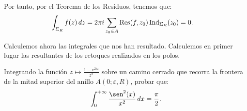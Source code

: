 \begin{ejercicio}
    Por tanto, por el Teorema de los Residuos, tenemos que:
    \begin{align*}
        \int_{\Sigma_R} f(z) \, dz &= 2\pi i\sum_{z_0\in A}\operatorname{Res}(f,z_0)\operatorname{Ind}_{\Sigma_R}(z_0) = 0.
    \end{align*}

    Calculemos ahora las integrales que nos han resultado. Calculemos en primer lugar las resultantes de los retoques realizados en los polos. 
    
\end{ejercicio}

\begin{ejercicio}
    Integrando la función $z \mapsto \frac{1-e^{2i z}}{z^2}$ sobre un camino cerrado que recorra la frontera de la mitad superior del anillo $A(0; \varepsilon, R)$, probar que:
    \begin{equation*}
        \int_0^{+\infty} \frac{\sen^2(x)}{x^2} \, dx = \frac{\pi}{2}.
    \end{equation*}
\end{ejercicio}

